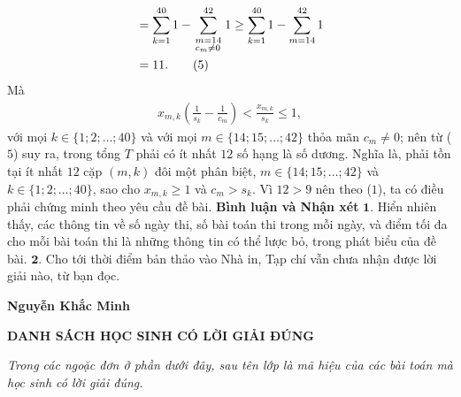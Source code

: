 \begin{multicols}{2}
\begin{align*}
		&= \sum\limits_{k = 1}^{40} 1  - \sum\limits_{\scriptstyle m = 14\hfill\atop
			\scriptstyle{c_m} \ne 0\hfill}^{42} 1  \ge \sum\limits_{k = 1}^{40} 1  - \sum\limits_{m = 14}^{42} 1  \\
		&= 11. \tag{$5$}
	\end{align*}
	Mà
	\begin{align*}
		{x_{m,k}}\left( {\frac{1}{{{s_k}}} - \frac{1}{{{c_m}}}} \right) < \frac{{{x_{m,k}}}}{{{s_k}}} \le 1,
	\end{align*}
	với mọi $k \in \{1; 2; \ldots; 40\}$ và với mọi \linebreak$m \in \{14; 15; \ldots; 42\}$ thỏa mãn $c_m \ne 0$; nên từ ($5$) suy ra, trong tổng $T$ phải có ít nhất $12$ số hạng là số dương. Nghĩa là, phải tồn tại ít nhất $12$ cặp $(m, k)$ đôi một phân biệt, $m \in \{14; 15; \ldots; 42\}$ và $k \in \{1; 2; \ldots; 40\}$, sao cho $x_{m,k} \ge 1$  và $c_m > s_k$. Vì $12 > 9$ nên theo ($1$), ta có điều phải chứng minh theo yêu cầu đề bài.
	\vskip 0.05cm
	\textbf{\color{thachthuctoanhoc}Bình luận và Nhận xét}
	\vskip 0.05cm
	$\pmb{1.}$ Hiển nhiên thấy, các thông tin về số ngày thi, số bài toán thi trong mỗi ngày, và điểm tối đa cho mỗi bài toán thi là những thông tin có thể lược bỏ, trong phát biểu của đề bài.
	\vskip 0.05cm
	$\pmb{2.}$ Cho tới thời điểm bản thảo vào Nhà in, Tạp chí vẫn chưa nhận được lời giải nào, từ bạn đọc.
	\begin{flushright}
		\textbf{\color{thachthuctoanhoc}Nguyễn Khắc Minh}
	\end{flushright}
\end{multicols}
\begin{center}
	\textbf{\color{thachthuctoanhoc}\color{thachthuctoanhoc}DANH SÁCH HỌC SINH CÓ LỜI GIẢI ĐÚNG}
\end{center}
\textit{Trong các ngoặc đơn ở phần dưới đây, sau tên lớp là mã hiệu của các bài toán mà học sinh có lời giải đúng.}
